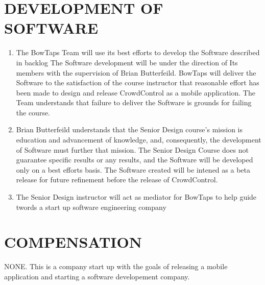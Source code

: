 \documentclass[11pt]{article}
\begin{document}
\section{DEVELOPMENT OF SOFTWARE }
\begin{enumerate}  \itemsep4pt \parskip0pt 
\item  The BowTaps Team will use its best efforts to develop the Software described in backlog The Software development will be under the direction of Its members with the supervision of Brian Butterfeild.  BowTaps will deliver the Software to the satisfaction of the course instructor that reasonable effort has been made to design and release CrowdControl as a mobile application.  The Team understands that failure to deliver the Software is grounds for failing the course. 

\item  Brian Butterfeild understands that the Senior Design course's mission is education and advancement of knowledge, and, consequently, the development of Software must further that mission. The Senior Design Course does not guarantee specific results or any results, and the Software will be developed only on a best efforts basis.  The Software created will be intened as a beta release for future refinement before the release of CrowdControl.

\item  The Senior Design instructor will act as mediator for BowTaps to help guide twords a start up software engineering company
\end{enumerate}

\section{COMPENSATION}

 NONE. This is a company start up with the goals of releasing a mobile application and starting a software developement company.
\end{document}
